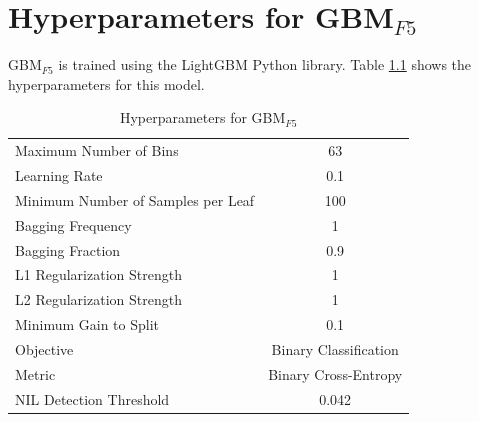 \documentclass{report}
\theoremstyle{definition}
\theoremstyle{remark}
\begin{document}
\appendix
\chapter{Hyperparameters for GBM$_{F5}$}
\label{app:lgbm}

GBM$_{F5}$ is trained using the LightGBM \cite{lightgbmlib} Python library. Table \ref{tab:lgbmhyper} shows the hyperparameters for this model.

\begin{table}[H]
    \centering
    \begin{tabular}{|lc|}
    \hline
     Maximum Number of Bins & 63  \\
     Learning Rate & 0.1\\
     Minimum Number of Samples per Leaf & 100 \\
     Bagging Frequency & 1 \\
     Bagging Fraction & 0.9 \\
     L1 Regularization Strength & 1 \\
     L2 Regularization Strength & 1 \\
     Minimum Gain to Split & 0.1 \\
     Objective & Binary Classification \\
     Metric & Binary Cross-Entropy \\
     NIL Detection Threshold & 0.042\\
     \hline
    \end{tabular}
    \caption{Hyperparameters for GBM$_{F5}$}
    \label{tab:lgbmhyper}
\end{table}
\end{document}
